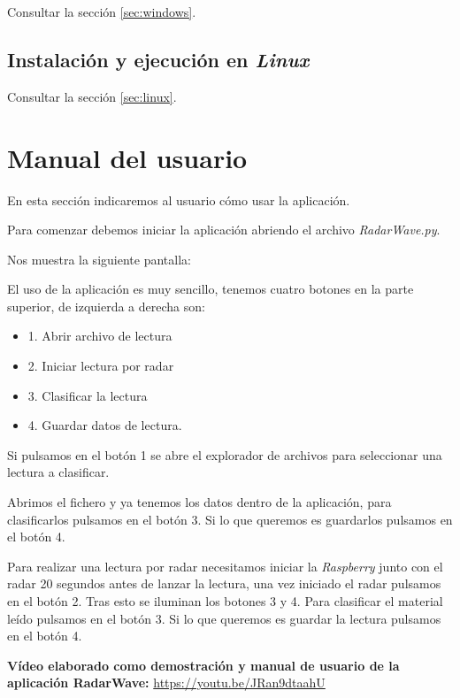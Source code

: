 Consultar la sección \ref{sec:windows}.

\subsection{Instalación y ejecución en \textit{Linux}}

Consultar la sección \ref{sec:linux}.

\section{Manual del usuario}

En esta sección indicaremos al usuario cómo usar la aplicación.

Para comenzar debemos iniciar la aplicación abriendo el archivo \textit{RadarWave.py}.

Nos muestra la siguiente pantalla:


El uso de la aplicación es muy sencillo, tenemos cuatro botones en la parte superior, de izquierda a derecha son:
\begin{itemize}
\item 1. Abrir archivo de lectura
\item 2. Iniciar lectura por radar
\item 3. Clasificar la lectura
\item 4. Guardar datos de lectura.
\end{itemize}

Si pulsamos en el botón 1 se abre el explorador de archivos para seleccionar una lectura a clasificar.

Abrimos el fichero y ya tenemos los datos dentro de la aplicación, para clasificarlos pulsamos en el botón 3. Si lo que queremos es guardarlos pulsamos en el botón 4.

Para realizar una lectura por radar necesitamos iniciar la \textit{Raspberry} junto con el radar 20 segundos antes de lanzar la lectura, una vez iniciado el radar pulsamos en el botón 2. Tras esto se iluminan los botones 3 y 4. Para clasificar el material leído pulsamos en el botón 3. Si lo que queremos es guardar la lectura pulsamos en el botón 4.

\textbf{Vídeo elaborado como demostración y manual de usuario de la aplicación RadarWave:} \url{https://youtu.be/JRan9dtaahU}


